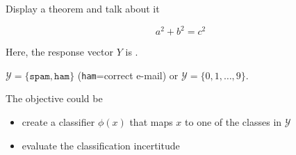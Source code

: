 \begin{frame}{Display a theorem and talk about it}

	\vspace{0.4cm}

	{
		\begin{equation*}
			a^2 + b^2 = c^2
		\end{equation*}
	}

	\vspace{0.25cm}

	Here, the response vector $Y$ is .

	\vspace{0.25cm}

	\exple
	$\mathcal{Y} = \{\texttt{spam},  \texttt{ham}\}$ (\texttt{ham}=correct e-mail) or $\mathcal{Y}= \{0, 1, \dots,9\}$.

	The objective could be
	\begin{itemize}
		\item create a classifier $\phi(x)$ that maps $x$ to one of the classes in $\mathcal{Y}$
		\item evaluate the classification incertitude 
	\end{itemize}


\end{frame}



